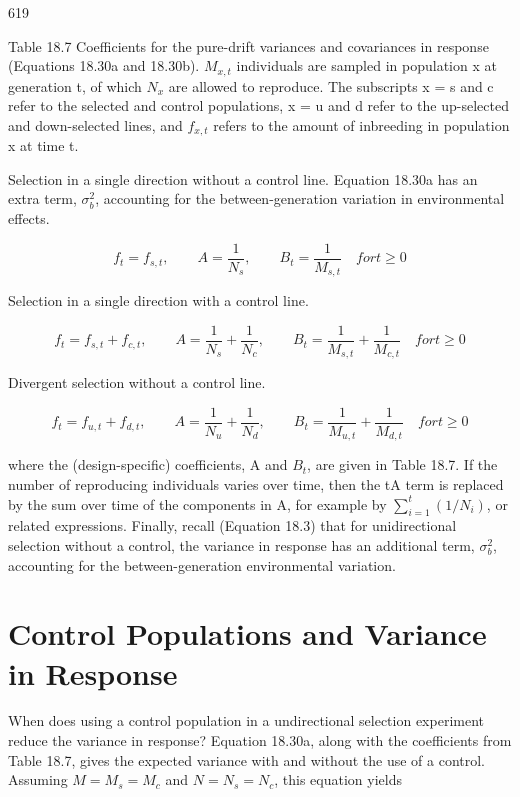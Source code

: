 \documentclass{article}
\begin{document}
619

Table 18.7 Coefficients for the pure-drift variances and covariances in response (Equations 18.30a and 18.30b).  $ M_{x,t} $ individuals are sampled in population x at generation t, of which  $ N_x $ are allowed to reproduce. The subscripts x = s and c refer to the selected and control populations, x = u and d refer to the up-selected and down-selected lines, and  $ f_{x,t} $ refers to the amount of inbreeding in population x at time t.

Selection in a single direction without a control line. Equation 18.30a has an extra term,  $ \sigma_{b}^{2} $, accounting for the between-generation variation in environmental effects.

\begin{equation}
f_{t}=f_{s,t},\qquad A=\frac{1}{N_{s}},\qquad B_{t}=\frac{1}{M_{s,t}}\quad for t\geq0
\end{equation}

Selection in a single direction with a control line.

\begin{equation}
f_{t}=f_{s,t}+f_{c,t},\qquad A=\frac{1}{N_{s}}+\frac{1}{N_{c}},\qquad B_{t}=\frac{1}{M_{s,t}}+\frac{1}{M_{c,t}}\quad for t\geq0
\end{equation}

Divergent selection without a control line.

\begin{equation}
f_{t}=f_{u,t}+f_{d,t},\qquad A=\frac{1}{N_{u}}+\frac{1}{N_{d}},\qquad B_{t}=\frac{1}{M_{u,t}}+\frac{1}{M_{d,t}}\quad for t\geq0
\end{equation}

where the (design-specific) coefficients, A and  $ B_t $, are given in Table 18.7. If the number of reproducing individuals varies over time, then the tA term is replaced by the sum over time of the components in A, for example by  $ \sum_{i=1}^t (1/N_i) $, or related expressions. Finally, recall (Equation 18.3) that for unidirectional selection without a control, the variance in response has an additional term,  $ \sigma_b^2 $, accounting for the between-generation environmental variation.

\section{Control Populations and Variance in Response}
When does using a control population in a undirectional selection experiment reduce the variance in response? Equation 18.30a, along with the coefficients from Table 18.7, gives the expected variance with and without the use of a control. Assuming  $ M = M_s = M_c $ and  $ N = N_s = N_c $, this equation yields
\end{document}
